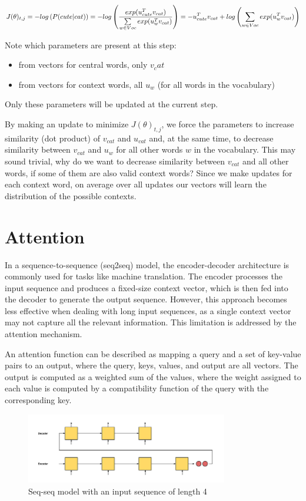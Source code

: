 \documentclass{report}
\begin{document}
$$J(\theta)_{t,j}= -log\left(P({cute}|{cat})\right) =
        -log \left(\frac{exp({u_{cute}^T}{v_{cat}})}{
		\sum\limits_{w\in Voc}exp({{u_w^T}{v_{cat}} })}\right) =
    -{u_{cute}^T}{v_{cat}}
        + log\left( \sum\limits_{w\in Voc}exp({{u_w^T}{v_{cat}}})\right)$$

Note which parameters are present at this step:
\begin{itemize}
	\item from vectors for central words, only $v_cat$
	\item from vectors for context words, all $u_w$ (for all words in the vocabulary)
\end{itemize}
Only these parameters will be updated at the current step.

By making an update to minimize $J(\theta)_{t,j}$, we force the parameters to increase similarity (dot product) of $v_{cat}$ and $u_{cat}$ and, at the same time, to decrease similarity between $v_{cat}$ and $u_w$ for all other words $w$ in the vocabulary. This may sound trivial, why do we want to decrease similarity between $v_{cat}$ and all other words, if some of them are also valid context words? Since we make updates for each context word, on average over all updates our vectors will learn the distribution of the possible contexts.

\section{Attention}
In a sequence-to-sequence (seq2seq) model, the encoder-decoder architecture is commonly used for tasks like machine translation. The encoder processes the input sequence and produces a fixed-size context vector, which is then fed into the decoder to generate the output sequence. However, this approach becomes less effective when dealing with long input sequences, as a single context vector may not capture all the relevant information. This limitation is addressed by the attention mechanism.

An attention function can be described as mapping a query and a set of key-value pairs to an output, where the query, keys, values, and output are all vectors. The output is computed as a weighted sum of the values, where the weight assigned to each value is computed by a compatibility function of the query with the corresponding key.

\begin{figure}[ht]
	\includegraphics[width=250pt]{55}
	\centering
	\caption{Seq-seq model with an input sequence of length 4}
\end{figure}
\end{document}
